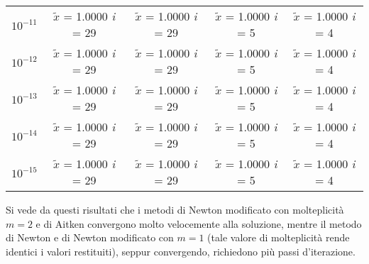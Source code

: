 \begin{center}
\begin{tabular}{|c|c|c|c|c|}
			$10^{-11}$ & $\tilde{x}$ = 1.0000 \quad \textit{i} = 29 & $\tilde{x}$ = 1.0000 \quad \textit{i} = 29 & $\tilde{x}$ = 1.0000 \quad \textit{i} = 5 & $\tilde{x}$ = 1.0000 \quad \textit{i} = 4\\
			$10^{-12}$ & $\tilde{x}$ = 1.0000 \quad \textit{i} = 29 & $\tilde{x}$ = 1.0000 \quad \textit{i} = 29 & $\tilde{x}$ = 1.0000 \quad \textit{i} = 5 & $\tilde{x}$ = 1.0000 \quad \textit{i} = 4\\
			$10^{-13}$ & $\tilde{x}$ = 1.0000 \quad \textit{i} = 29 & $\tilde{x}$ = 1.0000 \quad \textit{i} = 29 & $\tilde{x}$ = 1.0000 \quad \textit{i} = 5 & $\tilde{x}$ = 1.0000 \quad \textit{i} = 4\\
			$10^{-14}$ & $\tilde{x}$ = 1.0000 \quad \textit{i} = 29 & $\tilde{x}$ = 1.0000 \quad \textit{i} = 29 & $\tilde{x}$ = 1.0000 \quad \textit{i} = 5 & $\tilde{x}$ = 1.0000 \quad \textit{i} = 4\\
			$10^{-15}$ & $\tilde{x}$ = 1.0000 \quad \textit{i} = 29 & $\tilde{x}$ = 1.0000 \quad \textit{i} = 29 & $\tilde{x}$ = 1.0000 \quad \textit{i} = 5 & $\tilde{x}$ = 1.0000 \quad \textit{i} = 4\\
		\hline
	\end{tabular}
\end{center}
Si vede da questi risultati che i metodi di Newton modificato con molteplicità $m=2$ e di Aitken convergono molto velocemente alla soluzione, mentre il metodo di Newton e di Newton modificato con $m=1$ (tale valore di molteplicità rende identici i valori restituiti), seppur convergendo, richiedono più passi d'iterazione.
